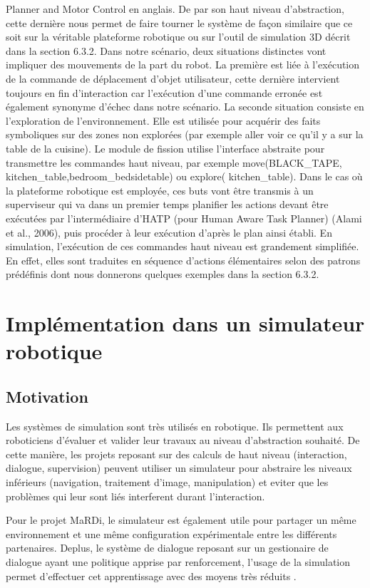 \documentclass[a4paper,11pt,twoside]{StyleThese}
\begin{document}
Planner and Motor Control en anglais. De par son haut niveau d’abstraction, cette
dernière nous permet de faire tourner le système de façon similaire que ce soit sur la véritable
plateforme robotique ou sur l’outil de simulation 3D décrit dans la section 6.3.2.
Dans notre scénario, deux situations distinctes vont impliquer des mouvements de la
part du robot. La première est liée à l’exécution de la commande de déplacement d’objet
utilisateur, cette dernière intervient toujours en fin d’interaction car l’exécution d’une
commande erronée est également synonyme d’échec dans notre scénario. La seconde
situation consiste en l’exploration de l’environnement. Elle est utilisée pour acquérir
des faits symboliques sur des zones non explorées (par exemple aller voir ce qu’il y a
sur la table de la cuisine).
Le module de fission utilise l’interface abstraite pour transmettre les commandes
haut niveau, par exemple move(BLACK\_TAPE, kitchen\_table,bedroom\_bedsidetable) ou explore(
kitchen\_table). Dans le cas où la plateforme robotique est employée, ces buts vont
être transmis à un superviseur qui va dans un premier temps planifier les actions devant
être exécutées par l’intermédiaire d’HATP (pour Human Aware Task Planner) (Alami
et al., 2006), puis procéder à leur exécution d’après le plan ainsi établi. En simulation,
l’exécution de ces commandes haut niveau est grandement simplifiée. En effet, elles
sont traduites en séquence d’actions élémentaires selon des patrons prédéfinis dont nous donnerons quelques exemples dans la section 6.3.2.




\section{Implémentation dans un simulateur robotique}

\subsection{Motivation}
Les systèmes de simulation sont très utilisés en robotique. Ils permettent aux roboticiens d'évaluer et valider leur travaux au niveau d'abstraction souhaité. De cette manière, les projets reposant sur des calculs de haut niveau (interaction, dialogue, supervision) peuvent utiliser un simulateur pour abstraire les niveaux inférieurs (navigation, traitement d'image, manipulation) et eviter que les problèmes qui leur sont liés interferent durant l'interaction.

Pour le projet MaRDi, le simulateur est également utile pour partager un même environnement et une même configuration expérimentale entre les différents partenaires. Deplus, le système de dialogue reposant sur un gestionaire de dialogue ayant une politique apprise par renforcement, l'usage de la simulation permet d'effectuer cet apprentissage avec des moyens très réduits \cite{simpar_2014}.
\end{document}
